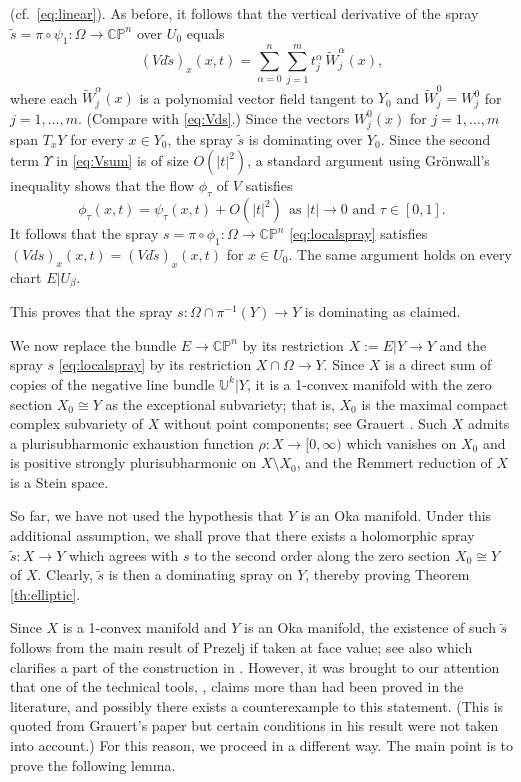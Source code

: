 \documentclass[12pt]{amsart}
\theoremstyle{definition}
\numberwithin{equation}{section}
\numberwithin{figure}{section}
\newcommand\CP{\mathbb{CP}}
\newcommand\U{\mathbb{U}}
\newcommand\wt{\widetilde}
\numberwithin{equation}{section}
\begin{document}
(cf.\ \eqref{eq:linear}). As before, it follows that the vertical
derivative of the spray 
$\tilde s=\pi\circ\psi_1:\Omega\to \CP^n$ over $U_0$ equals 
\[ 
	(V\! d\tilde s)_{x}(x,t)= 
	\sum_{\alpha=0}^n \sum_{j=1}^m t^\alpha_j\, \wt W^\alpha_j(x),
\] 
where each $\wt W^\alpha_j(x)$ is a polynomial vector field 
tangent to $Y_0$ and $\wt W^0_j=W^0_j$ for $j=1,\ldots,m$. 
(Compare with \eqref{eq:Vds}.) Since the vectors 
$W^0_j(x)$ for $j=1,\ldots,m$ 
span $T_xY$ for every $x\in Y_0$, the spray 
$\tilde s$ is dominating over $Y_0$. Since the second term
$\Upsilon$ in \eqref{eq:Vsum} is of size $O(|t|^2)$, 
a standard argument using Gr\"onwall's inequality
shows that the flow $\phi_\tau$ of $V$ satisfies 
\[
	\phi_\tau(x,t) = \psi_\tau(x,t)+O(|t|^2)\ \ \text{as $|t|\to 0$ and 
	$\tau\in [0,1]$}.
\]
It follows that the spray $s=\pi\circ \phi_1:\Omega\to\CP^n$
\eqref{eq:localspray} satisfies $(V\! ds)_{x}(x,t)=(V\! d\tilde s)_{x}(x,t)$ 
for $x\in U_0$. The same argument holds on every chart $E|U_\beta$.

This proves that the spray $s:\Omega\cap \pi^{-1}(Y)\to Y$ 
is dominating as claimed. 

%
%  
We now replace the bundle $E\to \CP^n$ 
by its restriction $X:=E|Y \to Y$ and the spray $s$ 
\eqref{eq:localspray} by its restriction $X \cap \Omega\to Y$.
Since $X$ is a direct sum of copies 
of the negative line bundle $\U^k|Y$, it is a 1-convex manifold 
with the zero section $X_0\cong Y$ as the exceptional subvariety; 
that is, $X_0$ is the maximal compact complex subvariety 
of $X$ without point components;
see Grauert \cite[Satz 1, p.\ 341]{Grauert1962MA}.
Such $X$ admits a plurisubharmonic exhaustion function
$\rho:X\to[0,\infty)$ which vanishes on $X_0$ and is positive 
strongly plurisubharmonic on $X\setminus X_0$, and the Remmert
reduction of $X$ is a Stein space. 

So far, we have not used the hypothesis that $Y$ is an Oka manifold.
Under this additional assumption, we shall prove that there
exists a holomorphic spray $\tilde s: X \to Y$ which agrees
with $s$ to the second order along the zero section $X_0\cong Y$
of $X$. Clearly, $\tilde s$ is then a dominating spray on $Y$, 
thereby proving Theorem \ref{th:elliptic}.

Since $X$ is a 1-convex manifold and $Y$ is an Oka manifold,
the existence of such $\tilde s$ follows from 
the main result of Prezelj \cite{Prezelj2010} if taken at face value; 
see also \cite{Prezelj2016} which clarifies 
a part of the construction in \cite{Prezelj2010}. 
However, it was brought to our attention that one of the 
technical tools, \cite[Theorem 2.4]{Prezelj2010},  
claims more than had been proved in the literature,
and possibly there exists a counterexample to this statement.
(This is quoted from Grauert's paper \cite{Grauert1962MA} 
but certain conditions in his result were not taken into account.) 
For this reason, we proceed in a different way. 
The main point is to prove the following lemma.
\end{document}
